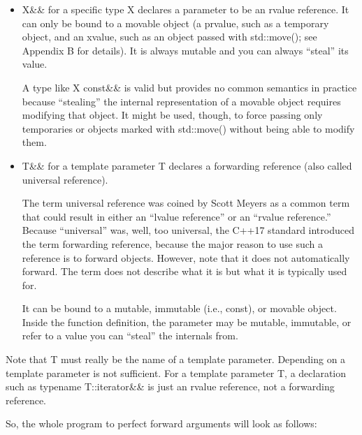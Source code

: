\begin{itemize}
\item 
X\&\& for a specific type X declares a parameter to be an rvalue reference. It can only be bound to a movable object (a prvalue, such as a temporary object, and an xvalue, such as an object passed with std::move(); see Appendix B for details). It is always mutable and you can always “steal” its value.

\begin{tcolorbox}[colback=webgreen!5!white,colframe=webgreen!75!black]
\hspace*{0.75cm}A type like X const\&\& is valid but provides no common semantics in practice because “stealing” the internal representation of a movable object requires modifying that object. It might be used, though, to force passing only temporaries or objects marked with std::move() without being able to modify them.
\end{tcolorbox}

\item 
T\&\& for a template parameter T declares a forwarding reference (also called universal reference).

\begin{tcolorbox}[colback=webgreen!5!white,colframe=webgreen!75!black]
\hspace*{0.75cm}The term universal reference was coined by Scott Meyers as a common term that could result in either an “lvalue reference” or an “rvalue reference.” Because “universal” was, well, too universal, the C++17 standard introduced the term forwarding reference, because the major reason to use such a reference is to forward objects. However, note that it does not automatically forward. The term does not describe what it is but what it is typically used for.
\end{tcolorbox}

It can be bound to a mutable, immutable (i.e., const), or movable object. Inside the function definition, the parameter may be mutable, immutable, or refer to a value you can “steal” the internals from.
\end{itemize}

Note that T must really be the name of a template parameter. Depending on a template parameter is not sufficient. For a template parameter T, a declaration such as typename T::iterator\&\& is just an rvalue reference, not a forwarding reference.

So, the whole program to perfect forward arguments will look as follows:

